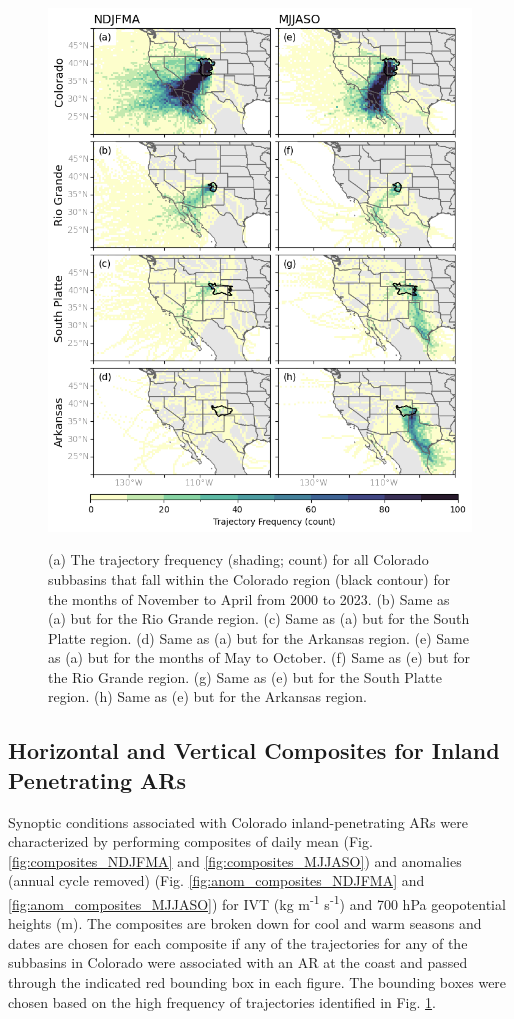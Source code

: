 \documentclass[draft]{agujournal2019}
\begin{document}
\begin{figure}
\noindent\includegraphics[width=\textwidth]{fig6.png}
\label{fig:heatmaps}
\caption{(a) The trajectory frequency (shading; count) for all Colorado subbasins that fall within the Colorado region (black contour) for the months of November to April from 2000 to 2023. (b) Same as (a) but for the Rio Grande region. (c) Same as (a) but for the South Platte region. (d) Same as (a) but for the Arkansas region. (e) Same as (a) but for the months of May to October. (f) Same as (e) but for the Rio Grande region. (g) Same as (e) but for the South Platte region. (h) Same as (e) but for the Arkansas region.}
\end{figure}

\subsection{Horizontal and Vertical Composites for Inland Penetrating ARs}
\label{sec:results:composite_analysis}

Synoptic conditions associated with Colorado inland-penetrating ARs were characterized by performing composites of daily mean (Fig. \ref{fig:composites_NDJFMA} and \ref{fig:composites_MJJASO}) and anomalies (annual cycle removed) (Fig. \ref{fig:anom_composites_NDJFMA} and \ref{fig:anom_composites_MJJASO}) for IVT (kg m\textsuperscript{-1} s\textsuperscript{-1}) and 700 hPa geopotential heights (m). The composites are broken down for cool and warm seasons and dates are chosen for each composite if any of the trajectories for any of the subbasins in Colorado were associated with an AR at the coast and passed through the indicated red bounding box in each figure. The bounding boxes were chosen based on the high frequency of trajectories identified in Fig. \ref{fig:heatmaps}. 
\end{document}
